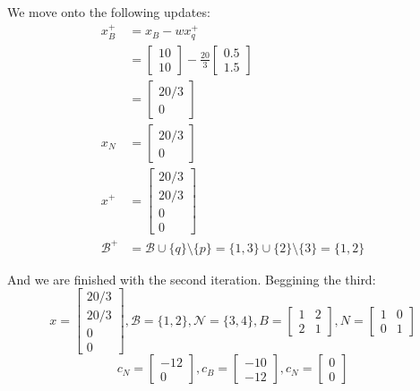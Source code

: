 \documentclass[12pt]{article}
\begin{document}
We move onto the following updates:
\begin{align*}
x_B^+ &= x_B - wx_q^+ \\
&= \left[\begin{array}{c} 10 \\ 10 \end{array}\right] - \frac{20}{3}\left[\begin{array}{c} 0.5 \\ 1.5 \end{array}\right]\\
&= \left[\begin{array}{c} 20/3 \\ 0 \end{array}\right] \\
x_N &= \left[\begin{array}{c} 20/3 \\ 0 \end{array}\right] \\
x^+ &= \left[\begin{array}{c} 20/3\\ 20/3 \\ 0 \\ 0 \end{array}\right] \\
\mathcal{B}^+ &= \mathcal{B} \cup \{q\} \setminus \{p\} = \{1,3\} \cup \{2\} \setminus \{3\} = \{1,2\}
\end{align*}

And we are finished with the second iteration. Beggining the third:
$$
x = \left[\begin{array}{c}20/3 \\ 20/3 \\ 0 \\ 0 \end{array}\right],
\mathcal{B} = \{1,2\},
\mathcal{N} = \{3,4\},
B = \left[\begin{array}{cc} 1&2 \\ 2&1 \end{array}\right],
N = \left[\begin{array}{cc} 1&0 \\ 0&1 \end{array}\right]
$$
$$
c_N = \left[\begin{array}{c} -12 \\ 0 \end{array}\right],
c_B = \left[\begin{array}{c} -10 \\ -12 \end{array}\right],
c_N = \left[\begin{array}{c} 0 \\ 0 \end{array}\right]
$$
\end{document}
